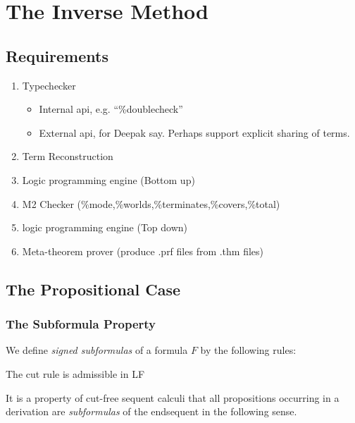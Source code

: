 
\section{The Inverse Method}

\subsection{Requirements}

\begin{enumerate} 
\item Typechecker
  \begin{itemize} 
  \item Internal api, e.g. ``\%doublecheck''
  \item External api, for Deepak say.  Perhaps support explicit sharing of terms.
  \end{itemize} 
\item Term Reconstruction
\item Logic programming engine (Bottom up)
\item M2 Checker (\%mode,\%worlds,\%terminates,\%covers,\%total)
\item logic programming engine (Top down)
\item Meta-theorem prover (produce .prf files from .thm files)
\end{enumerate} 

\subsection{The Propositional Case}

\subsubsection{The Subformula Property}

We define \emph{signed subformulas} of a formula $F$ by the following rules:







\begin{Theorem} The cut rule is admissible in LF \end{Theorem} 

It is a property of cut-free sequent calculi that all propositions occurring
in a derivation are \emph{subformulas} of the endsequent in the following sense.



